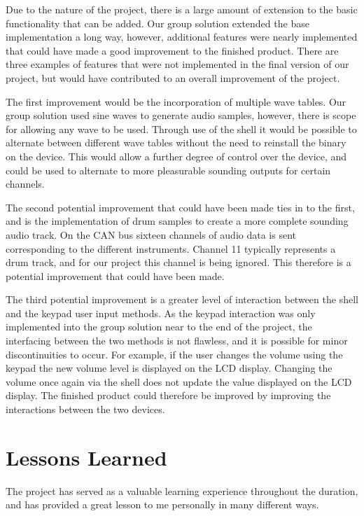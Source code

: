 Due to the nature of the project, there is a large amount of extension to the 
basic functionality that can be added. Our group solution extended the base 
implementation a long way, however, additional features were nearly implemented
that could have made a good improvement to the finished product. 
There are three examples of features that were not implemented in the final 
version of our project, but would have contributed to an overall improvement of 
the project. 
\par\bigskip\noindent
The first improvement would be the incorporation of multiple wave 
tables. 
Our group solution used sine waves to generate audio samples, however, 
there is scope for allowing any wave to be used. 
Through use of the shell it would be possible to alternate between different 
wave tables without the need to reinstall the binary on the device. This would 
allow a further degree of control over the device, and could be used to alternate
to more pleasurable sounding outputs for certain channels. 
\par\bigskip\noindent
The second potential improvement that could have been made ties in to the first, 
and is the implementation of drum samples to create a more complete sounding 
audio track. On the CAN bus sixteen channels of audio data is sent corresponding 
to the different instruments. Channel 11 typically represents a drum track, and 
for our project this channel is being ignored. This therefore is a potential
improvement that could have been made. 
\par\bigskip\noindent
The third potential improvement is a greater level of interaction between the 
shell and the keypad user input methods. As the keypad interaction was only 
implemented into the group solution near to the end of the project, the interfacing 
between the two methods is not flawless, and it is possible for minor 
discontinuities to occur. For example, if the user changes the volume using the 
keypad the new volume level is displayed on the LCD display. Changing the 
volume once again via the shell does not update the value displayed on the LCD 
display. The finished product could therefore be improved by improving the 
interactions between the two devices. 

\section{Lessons Learned}

The project has served as a valuable learning experience throughout the duration, 
and has provided a great lesson to me personally in many different ways. 

